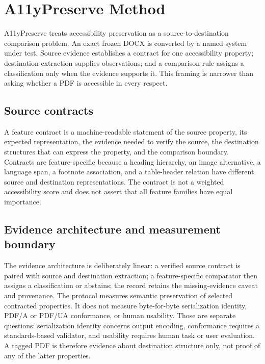 \section{A11yPreserve Method}
\label{sec:method}

A11yPreserve treats accessibility preservation as a source-to-destination comparison problem. An exact frozen DOCX is converted by a named system under test. Source evidence establishes a contract for one accessibility property; destination extraction supplies observations; and a comparison rule assigns a classification only when the evidence supports it. This framing is narrower than asking whether a PDF is accessible in every respect.

\subsection{Source contracts}
A feature contract is a machine-readable statement of the source property, its expected representation, the evidence needed to verify the source, the destination structures that can express the property, and the comparison boundary. Contracts are feature-specific because a heading hierarchy, an image alternative, a language span, a footnote association, and a table-header relation have different source and destination representations. The contract is not a weighted accessibility score and does not assert that all feature families have equal importance.

\subsection{Evidence architecture and measurement boundary}
The evidence architecture is deliberately linear: a verified source contract is paired with source and destination extraction; a feature-specific comparator then assigns a classification or abstains; the record retains the missing-evidence caveat and provenance. The protocol measures semantic preservation of selected contracted properties. It does not measure byte-for-byte serialization identity, PDF/A or PDF/UA conformance, or human usability. Those are separate questions: serialization identity concerns output encoding, conformance requires a standards-based validator, and usability requires human task or user evaluation. A tagged PDF is therefore evidence about destination structure only, not proof of any of the latter properties.


